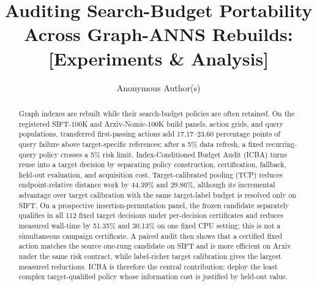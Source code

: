 \documentclass[sigconf,anonymous]{acmart}
\title[Auditing Search-Budget Portability]{Auditing Search-Budget Portability Across Graph-ANNS Rebuilds: [Experiments \& Analysis]}
\author{Anonymous Author(s)}
\begin{document}
\begin{abstract}
Graph indexes are rebuilt while their search-budget policies are often retained. On the registered SIFT-100K and Arxiv-Nomic-100K build panels, action grids, and query populations, transferred first-passing actions add 17.17--23.60 percentage points of query failure above target-specific references; after a 5\% data refresh, a fixed recurring-query policy crosses a 5\% risk limit. Index-Conditioned Budget Audit (ICBA) turns reuse into a target decision by separating policy construction, certification, fallback, held-out evaluation, and acquisition cost. Target-calibrated pooling (TCP) reduces endpoint-relative distance work by 44.39\% and 29.86\%, although its incremental advantage over target calibration with the same target-label budget is resolved only on SIFT. On a prospective insertion-permutation panel, the frozen candidate separately qualifies in all 112 fixed target decisions under per-decision certificates and reduces measured wall-time by 51.35\% and 30.13\% on one fixed CPU setting; this is not a simultaneous campaign certificate. A paired audit then shows that a certified fixed action matches the source one-rung candidate on SIFT and is more efficient on Arxiv under the same risk contract, while label-richer target calibration gives the largest measured reductions. ICBA is therefore the central contribution: deploy the least complex target-qualified policy whose information cost is justified by held-out value.
\end{abstract}
\maketitle
\raggedbottom











\balance


\end{document}

